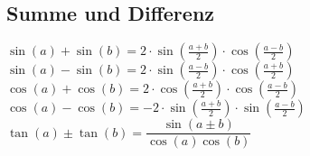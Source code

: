 \subsection{Summe und Differenz}
	$\sin(a)+\sin(b)=2 \cdot \sin \left(\frac{a+b}{2}\right) \cdot
	\cos\left(\frac{a-b}{2}\right)$\\
	$\sin(a)-\sin(b)=2 \cdot \sin \left(\frac{a-b}{2}\right) \cdot
	\cos\left(\frac{a+b}{2}\right)$\\
	$\cos(a)+\cos(b)=2 \cdot \cos \left(\frac{a+b}{2}\right) \cdot
	\cos\left(\frac{a-b}{2}\right)$\\
	$\cos(a)-\cos(b)=-2 \cdot \sin \left(\frac{a+b}{2}\right) \cdot
	\sin\left(\frac{a-b}{2}\right)$\\
	$\tan(a) \pm \tan(b)=\dfrac{\sin(a \pm b)}{\cos(a)\cos(b)}$\\

